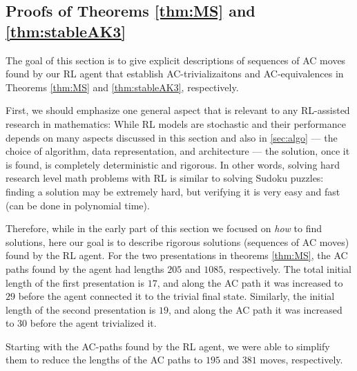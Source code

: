 \subsection{Proofs of Theorems \ref{thm:MS} and \ref{thm:stableAK3}}\label{sec:RLsolutions}

The goal of this section is to give explicit descriptions of sequences of AC moves found by our RL agent that establish AC-trivializaitons and AC-equivalences in Theorems \ref{thm:MS} and \ref{thm:stableAK3}, respectively.

First, we should emphasize one general aspect that is relevant to any RL-assisted research in mathematics: While RL models are stochastic and their performance depends on many aspects discussed in this section and also in \autoref{sec:algo} --- the choice of algorithm, data representation, and architecture --- the solution, once it is found, is completely deterministic and rigorous.
In other words, solving hard research level math problems with RL is similar to solving Sudoku puzzles: finding a solution may be extremely hard, but verifying it is very easy and fast (can be done in polynomial time).

Therefore, while in the early part of this section we focused on {\it how} to find solutions, here our goal is to describe rigorous solutions (sequences of AC moves) found by the RL agent.
%
For the two presentations in theorems \ref{thm:MS}, the AC paths found by the agent had lengths $205$ and $1085$, respectively. The total initial length of the first presentation is $17$, and along the AC path it was increased to $29$ before the agent connected it to the trivial final state. Similarly, the initial length of the second presentation is $19$, and along the AC path it was increased to $30$ before the agent trivialized it.

Starting with the AC-paths found by the RL agent, we were able to simplify them to reduce the lengths of the AC paths to $195$ and $381$ moves, respectively.


